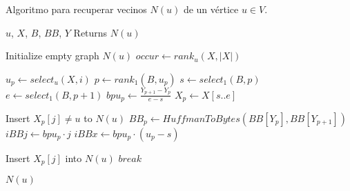\begin{algorithm}[H]
\caption{Algoritmo para recuperar vecinos $N(u)$ de un vértice $u \in V$.}
\label{alg:neighbors}
\begin{algorithmic}[1]
    \REQUIRE $u$, $X$, $B$, $BB$, $Y$
    \ENSURE Returns $N(u)$

    \STATE Initialize empty graph $N(u)$
    \STATE $occur \leftarrow rank_{u}(X, |X|)$

        	\STATE $u_{p} \leftarrow select_{u}(X, i)$
        	\STATE $p \leftarrow rank_{1}(B, u_{p})$
        	\STATE $s \leftarrow select_{1}(B, p)$
    		\STATE $e \leftarrow select_{1}(B, p + 1)$
        	\STATE $bpu_{p} \leftarrow \frac{Y_{p + 1} - Y_{p}}{e - s}$
        	\STATE $X_{p} \leftarrow X[s..e]$

       		
            			\STATE Insert $X_{p}[j] \neq u$ to $N(u)$
            		\ELSE
                		\STATE $BB_{p} \leftarrow HuffmanToBytes(BB[Y_{p}], BB[Y_{p + 1}])$
                		\STATE $iBBj \leftarrow bpu_{p} \cdot j$
                		\STATE $iBBx \leftarrow bpu_{p} \cdot (u_{p} - s)$
                		
                    			\STATE Insert $X_{p}[j]$ into $N(u)$
                    			\STATE $break$
                			\ENDIF
            			\ENDFOR
            		\ENDIF
            		
            	\ENDIF
        \ENDFOR
    \ENDFOR

    \RETURN $N(u)$
\end{algorithmic}
\end{algorithm}
